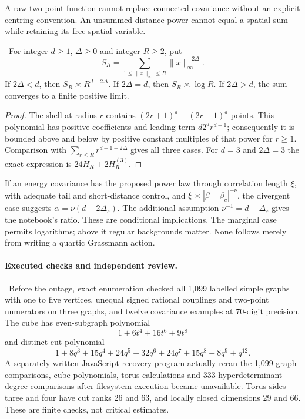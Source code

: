 A raw two-point function cannot replace connected covariance without
an explicit centring convention. An unsummed distance power cannot
equal a spatial sum while retaining its free spatial variable.

\begin{lemma}
\ours\ For integer $d\ge1$, $\Delta\ge0$ and integer $R\ge2$, put
\[
 S_R=\sum_{1\le\|x\|_\infty\le R}\|x\|_\infty^{-2\Delta}.
\]
If $2\Delta<d$, then $S_R\asymp R^{d-2\Delta}$.
If $2\Delta=d$, then $S_R\asymp\log R$.
If $2\Delta>d$, the sum converges to a finite positive limit.
\end{lemma}

\begin{proof}
The shell at radius $r$ contains
$(2r+1)^d-(2r-1)^d$ points. This polynomial has positive coefficients
and leading term $d2^d r^{d-1}$; consequently it is bounded above and
below by positive constant multiples of that power for $r\ge1$.
Comparison with $\sum_{r\le R}r^{d-1-2\Delta}$ gives all three cases.
For $d=3$ and $2\Delta=3$ the exact expression is
$24H_R+2H_R^{(3)}$.
\end{proof}

If an energy covariance has the proposed power law through correlation
length $\xi$, with adequate tail and short-distance control, and
$\xi\asymp|\beta-\beta_c|^{-\nu}$, the divergent case suggests
$\alpha=\nu(d-2\Delta_\varepsilon)$.
The additional assumption $\nu^{-1}=d-\Delta_\varepsilon$ gives the
notebook's ratio. These are conditional implications.
The marginal case permits logarithms; above it regular backgrounds
matter. None follows merely from writing a quartic Grassmann action.

\paragraph{Executed checks and independent review.}
\oursComputed\ Before the outage, exact enumeration checked all 1,099
labelled simple graphs with one to five vertices, unequal signed
rational couplings and two-point numerators on three graphs, and twelve
covariance examples at 70-digit precision. The cube has even-subgraph
polynomial
\[
 1+6t^4+16t^6+9t^8
\]
and distinct-cut polynomial
\[
 1+8q^3+15q^4+24q^5+32q^6+24q^7+15q^8+8q^9+q^{12}.
\]
A separately written JavaScript recovery program actually reran the
1,099 graph comparisons, cube polynomials, torus calculations and
333 hyperdeterminant degree comparisons after filesystem execution
became unavailable. Torus sides three and four have cut ranks 26 and 63,
and locally closed dimensions 29 and 66. These are finite checks,
not critical estimates.

